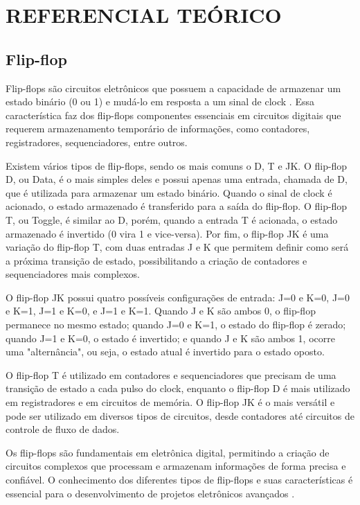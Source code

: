 \chapter{REFERENCIAL TEÓRICO}

\section{Flip-flop}
Flip-flops são circuitos eletrônicos que possuem a capacidade de armazenar um estado binário (0 ou 1) e mudá-lo em resposta a um sinal de clock \cite{floyd}. Essa característica faz dos flip-flops componentes essenciais em circuitos digitais que requerem armazenamento temporário de informações, como contadores, registradores, sequenciadores, entre outros.

Existem vários tipos de flip-flops, sendo os mais comuns o D, T e JK. O flip-flop D, ou Data, é o mais simples deles e possui apenas uma entrada, chamada de D, que é utilizada para armazenar um estado binário. Quando o sinal de clock é acionado, o estado armazenado é transferido para a saída do flip-flop. O flip-flop T, ou Toggle, é similar ao D, porém, quando a entrada T é acionada, o estado armazenado é invertido (0 vira 1 e vice-versa). Por fim, o flip-flop JK é uma variação do flip-flop T, com duas entradas J e K que permitem definir como será a próxima transição de estado, possibilitando a criação de contadores e sequenciadores mais complexos.

O flip-flop JK possui quatro possíveis configurações de entrada: J=0 e K=0, J=0 e K=1, J=1 e K=0, e J=1 e K=1. Quando J e K são ambos 0, o flip-flop permanece no mesmo estado; quando J=0 e K=1, o estado do flip-flop é zerado; quando J=1 e K=0, o estado é invertido; e quando J e K são ambos 1, ocorre uma "alternância", ou seja, o estado atual é invertido para o estado oposto.

O flip-flop T é utilizado em contadores e sequenciadores que precisam de uma transição de estado a cada pulso do clock, enquanto o flip-flop D é mais utilizado em registradores e em circuitos de memória. O flip-flop JK é o mais versátil e pode ser utilizado em diversos tipos de circuitos, desde contadores até circuitos de controle de fluxo de dados.

Os flip-flops são fundamentais em eletrônica digital, permitindo a criação de circuitos complexos que processam e armazenam informações de forma precisa e confiável. O conhecimento dos diferentes tipos de flip-flops e suas características é essencial para o desenvolvimento de projetos eletrônicos avançados \cite{tocci2010sistemas}.

